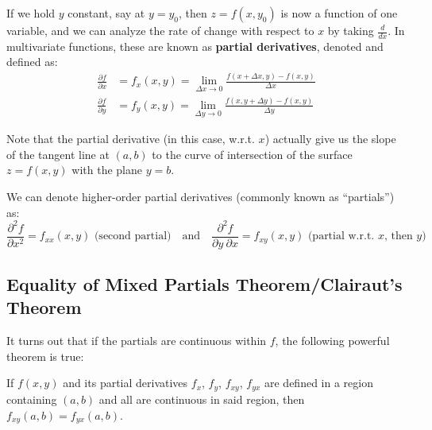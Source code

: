 \documentclass[12pt]{article}
\begin{document}
If we hold $y$ constant, say at $y = y_0$, then $z = f(x,y_0)$ is now a function of one variable, and we can analyze the rate of change with respect to $x$ by taking $\frac{d}{dx}$. In multivariate functions, these are known as \textbf{partial derivatives}, denoted and defined as:
\[
\begin{aligned}
\frac{\partial f}{\partial x} &= f_x(x,y) = \lim_{\Delta x \rightarrow 0}{\frac{f(x+\Delta x,y) - f(x,y)}{\Delta x}} \\
\frac{\partial f}{\partial y} &= f_y(x,y) = \lim_{\Delta y \rightarrow 0}{\frac{f(x,y+\Delta y) - f(x,y)}{\Delta y}}
\end{aligned}
\]

Note that the partial derivative (in this case, w.r.t. $x$) actually give us the slope of the tangent line at $(a,b)$ to the curve of intersection of the surface $z = f(x,y)$ with the plane $y = b$.

We can denote higher-order partial derivatives (commonly known as ``partials'') as:
\[ \frac{\partial^2f}{\partial x^2} = f_{xx}(x,y) \text{ (second partial)} \quad \text{and} \quad \frac{\partial^2f}{\partial y \ \partial x} = f_{xy}(x,y)\text{ (partial w.r.t. } x\text{, then } y \text{)} \]

\subsection{Equality of Mixed Partials Theorem/Clairaut's Theorem}
It turns out that if the partials are continuous within $f$, the following powerful theorem is true:

\begin{theorem}
If $f(x,y)$ and its partial derivatives $f_x$, $f_y$, $f_{xy}$, $f_{yx}$ are defined in a region containing $(a,b)$ and all are continuous in said region, then $f_{xy}(a,b) = f_{yx}(a,b)$.
\end{theorem}
\end{document}
